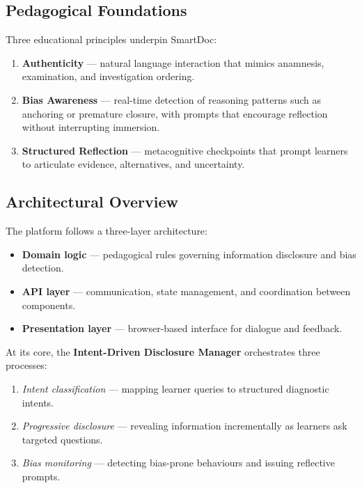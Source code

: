 \subsection{Pedagogical Foundations}

Three educational principles underpin SmartDoc:

\begin{enumerate}
  \item \textbf{Authenticity} — natural language interaction that mimics
  anamnesis, examination, and investigation ordering.
  \item \textbf{Bias Awareness} — real-time detection of reasoning patterns such
  as anchoring or premature closure, with prompts that encourage reflection
  without interrupting immersion.
  \item \textbf{Structured Reflection} — metacognitive checkpoints that prompt
  learners to articulate evidence, alternatives, and uncertainty.
\end{enumerate}

\subsection{Architectural Overview}

The platform follows a three-layer architecture:

\begin{itemize}
  \item \textbf{Domain logic} — pedagogical rules governing information
  disclosure and bias detection.
  \item \textbf{API layer} — communication, state management, and coordination
  between components.
  \item \textbf{Presentation layer} — browser-based interface for dialogue and
  feedback.
\end{itemize}

At its core, the \textbf{Intent-Driven Disclosure Manager} orchestrates three
processes:

\begin{enumerate}
  \item \textit{Intent classification} — mapping learner queries to structured
  diagnostic intents.
  \item \textit{Progressive disclosure} — revealing information incrementally as
  learners ask targeted questions.
  \item \textit{Bias monitoring} — detecting bias-prone behaviours and issuing
  reflective prompts.
\end{enumerate}

